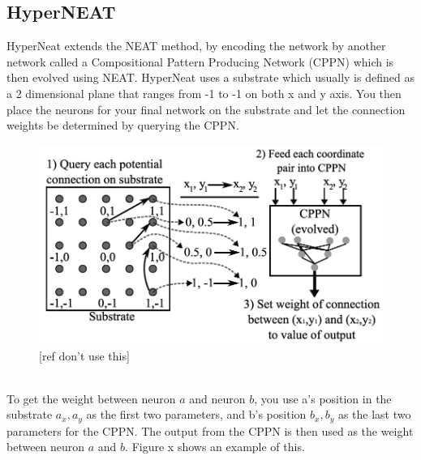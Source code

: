 \documentclass[11pt, a4paper]{article}
\begin{document}
\subsection{HyperNEAT}
HyperNeat extends the NEAT method, by encoding the network by another network called a Compositional Pattern Producing Network (CPPN) which is then evolved using NEAT. HyperNeat uses a substrate which usually is defined as a 2 dimensional plane that ranges from -1 to -1 on both x and y axis. You then place the neurons for your final network on the substrate and let the connection weights be determined by querying the CPPN.
\begin{figure}[!ht]
\centering
\includegraphics[scale=0.3]{HyperNeatSubstrate}
\caption{[ref don't use this]}
\end{figure}
\\
To get the weight between neuron $ a $ and neuron $ b $, you use a's position in the substrate $a_x, a_y$ as the first two parameters, and b's position $ b_x, b_y $ as the last two parameters for the CPPN. The output from the CPPN is then used as the weight between neuron $ a $ and $ b $. Figure x shows an example of this.
\end{document}
